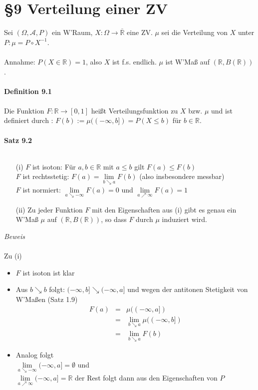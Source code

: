 \documentclass[10pt,a4paper]{report}
\newcommand{\R}{\mathbb{R}}
\numberwithin{equation}{section}
\numberwithin{figure}{section}
\theoremstyle{plain}
\theoremstyle{definition}
\theoremstyle{plain}
\theoremstyle{definition}
\theoremstyle{remark}
\theoremstyle{plain}
\theoremstyle{plain}
\theoremstyle{plain}
\newcommand{\1}{ \mathbb{1} } %
\begin{document}
\chapter*{\S 9 \qquad Verteilung einer ZV}
Sei $(\Omega,\mathcal{A},P)$ ein W'Raum, $X:\Omega \to \overline{\R}$ eine ZV. $\mu$ sei die Verteilung von $X$ unter $P: \mu=P\circ X^{-1}$.\\\\
Annahme: $P(X\in \R)=1$, also $X$ ist f.s. endlich. $\mu$ ist W'Maß auf $(\R,B(\R))$.\\\\
\textbf{Definition 9.1}\\\\
Die Funktion $F:\R \to [0,1]$ heißt Verteilungsfunktion zu $X$ bzw. $\mu$ und ist definiert durch : $F(b):=\mu((-\infty,b])=P(X\leq b)$ für $b \in \R$.\\\\
\textbf{Satz 9.2}\\\\
\begin{itemize}
\item[(i)] $F$ ist isoton: Für $a,b \in \R$ mit $a \leq b$ gilt $F(a)\leq F(b)$\\
$F$ ist rechtsstetig: $F(a)=\lim\limits_{b\searrow a}F(b)$ (also insbesondere messbar)\\
$F$ ist normiert: $\lim\limits_{a\searrow -\infty}F(a)=0$ und $\lim\limits_{a\nearrow \infty}F(a)=1$
\item[(ii)] Zu jeder Funktion $F$ mit den Eigenschaften aus (i) gibt es genau ein W'Maß $\mu$ auf $(\R,B(\R))$, so dass $F$ durch $\mu$ induziert wird. 
\end{itemize}
\textit{Beweis}\\\\
Zu (i)
\begin{itemize}
\item $F$ ist isoton ist klar
\item Aus $b \searrow b$ folgt: $(-\infty,b] \searrow (-\infty,a]$ und wegen der antitonen Stetigkeit von W'Maßen (Satz 1.9)
\begin{eqnarray*}
F(a)&=&\mu((-\infty,a])\\
&=& \lim\limits_{b\searrow a} \mu((-\infty,b]) \\
&=& \lim\limits_{b\searrow a} F(b)
\end{eqnarray*}
\item Analog folgt\\
$\lim\limits_{a\searrow -\infty} (-\infty,a]=\emptyset$ und\\
$\lim\limits_{a\nearrow \infty} (-\infty,a]=\R$ der Rest folgt dann aus den Eigenschaften von $P$
\end{itemize}
\end{document}
